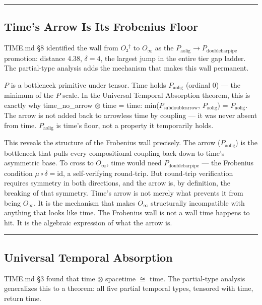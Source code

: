 \documentclass[12pt,a4paper]{article}
\newcommand{\pilcrow}{\S}
\begin{document}
\begin{center}
\rule{0.5\textwidth}{0.4pt}
\end{center}

\subsection{Time's Arrow Is Its Frobenius Floor}

TIME.md \pilcrow{}8 identified the wall from $O₂^\dagger$ to $O_{\infty}$ as the $P_{\text{aolig}} \to P_{\text{doublebarpipe}}$ promotion: distance 4.38, $\delta = 4$, the largest jump in the entire tier gap ladder. The partial-type analysis adds the mechanism that makes this wall permanent.

$P$ is a bottleneck primitive under tensor. Time holds $P_{\text{aolig}}$ (ordinal 0) --- the minimum of the $P$ scale. In the Universal Temporal Absorption theorem, this is exactly why time\_no\_arrow $\otimes$ time = time: min($P_{\text{subdoublearrow}}$, $P_{\text{aolig}}$) = $P_{\text{aolig}}$. The arrow is not added back to arrowless time by coupling --- it was never absent from time. $P_{\text{aolig}}$ is time's floor, not a property it temporarily holds.

This reveals the structure of the Frobenius wall precisely. The arrow ($P_{\text{aolig}}$) is the bottleneck that pulls every compositional coupling back down to time's asymmetric base. To cross to $O_{\infty}$, time would need $P_{\text{doublebarpipe}}$ --- the Frobenius condition $\mu \circ \delta = \text{id}$, a self-verifying round-trip. But round-trip verification requires symmetry in both directions, and the arrow is, by definition, the breaking of that symmetry. Time's arrow is not merely what prevents it from being $O_{\infty}$. It is the mechanism that makes $O_{\infty}$ structurally incompatible with anything that looks like time. The Frobenius wall is not a wall time happens to hit. It is the algebraic expression of what the arrow is.

\begin{center}
\rule{0.5\textwidth}{0.4pt}
\end{center}

\subsection{Universal Temporal Absorption}

TIME.md \pilcrow{}3 found that time $\otimes$ spacetime $\cong$ time. The partial-type analysis generalizes this to a theorem: all five partial temporal types, tensored with time, return time.
\end{document}
